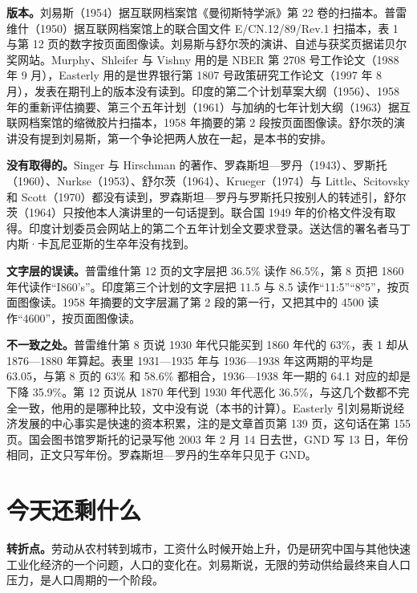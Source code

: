 \begin{deeper}[史料说明]
\textbf{版本。}刘易斯（1954）据互联网档案馆《曼彻斯特学派》第 22 卷的扫描本。普雷维什（1950）据互联网档案馆上的联合国文件 E/CN.12/89/Rev.1 扫描本，表 1 与第 12 页的数字按页面图像读。刘易斯与舒尔茨的演讲、自述与获奖页据诺贝尔奖网站。Murphy、Shleifer 与 Vishny 用的是 NBER 第 2708 号工作论文（1988 年 9 月），Easterly 用的是世界银行第 1807 号政策研究工作论文（1997 年 8 月），发表在期刊上的版本没有读到。印度的第二个计划草案大纲（1956）、1958 年的重新评估摘要、第三个五年计划（1961）与加纳的七年计划大纲（1963）据互联网档案馆的缩微胶片扫描本，1958 年摘要的第 2 段按页面图像读。舒尔茨的演讲没有提到刘易斯，第一个争论把两人放在一起，是本书的安排。

\textbf{没有取得的。}Singer 与 Hirschman 的著作、罗森斯坦—罗丹（1943）、罗斯托（1960）、Nurkse（1953）、舒尔茨（1964）、Krueger（1974）与 Little、Scitovsky 和 Scott（1970）都没有读到，罗森斯坦—罗丹与罗斯托只按别人的转述引，舒尔茨（1964）只按他本人演讲里的一句话提到。联合国 1949 年的价格文件没有取得。印度计划委员会网站上的第二个五年计划全文要求登录。送达信的署名者马丁内斯·卡瓦尼亚斯的生卒年没有找到。

\textbf{文字层的误读。}普雷维什第 12 页的文字层把 36.5\% 读作 86.5\%，第 8 页把 1860 年代读作“I860's”。印度第三个计划的文字层把 11.5 与 8.5 读作“11:5”“8°5”，按页面图像读。1958 年摘要的文字层漏了第 2 段的第一行，又把其中的 4500 读作“4600”，按页面图像读。

\textbf{不一致之处。}普雷维什第 8 页说 1930 年代只能买到 1860 年代的 63\%，表 1 却从 1876—1880 年算起。表里 1931—1935 年与 1936—1938 年这两期的平均是 63.05，与第 8 页的 63\% 和 58.6\% 都相合，1936—1938 年一期的 64.1 对应的却是下降 35.9\%。第 12 页说从 1870 年代到 1930 年代恶化 36.5\%，与这几个数都不完全一致，他用的是哪种比较，文中没有说（本书的计算）。Easterly 引刘易斯说经济发展的中心事实是快速的资本积累，注的是文章首页第 139 页，这句话在第 155 页。国会图书馆罗斯托的记录写他 2003 年 2 月 14 日去世，GND 写 13 日，年份相同，正文只写年份。罗森斯坦—罗丹的生卒年只见于 GND。
\end{deeper}

\section{今天还剩什么}\label{sec:development-legacy}

\textbf{转折点。}劳动从农村转到城市，工资什么时候开始上升，仍是研究中国与其他快速工业化经济的一个问题，人口的变化在。刘易斯说，无限的劳动供给最终来自人口压力，是人口周期的一个阶段\cite{lewisbio1979}。

